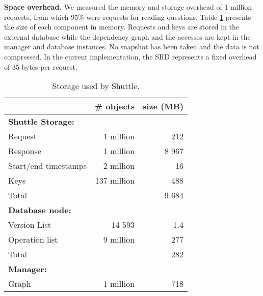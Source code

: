 \textbf{Space overhead.}
We measured the memory and storage overhead of 1 million requests, from which 95\% were requests for reading questions. Table \ref{tab:storage_overhead} presents the size of each component in memory. Requests and keys are stored in the external database while the dependency graph and the accesses are kept in the manager and database instances. No snapshot has been taken and the data is not compressed.
%
In the current implementation, the \ac{SRD} represents a fixed overhead of 35 bytes per request.

\begin{table}[h]
\centering
\footnotesize
  \begin{tabular}{l|rr}
                & \# objects & size (MB) \\ \hline
  \textbf{Shuttle Storage: }      \\
  Request         & 1 million    & 212       \\  %
  Response        & 1 million    & 8 967     \\  %
  Start/end timestamps      & 2 million    & 16        \\  %
  Keys            & 137 million  & 488       \\  %
  Total           &              & 9 684     \\  %
  \textbf{Database node:}        &           \\
  Version List    &  14 593      &  1.4       \\ %
  Operation list  &  9 million   &  277       \\ %
  Total           &              & 282 \\ %
  \textbf{Manager:} & & \\ 
  Graph           & 1 million    & 718 \\  %
  \end{tabular}            
\caption{Storage used by Shuttle.}
\label{tab:storage_overhead}
\vspace{-5mm}
\end{table}

